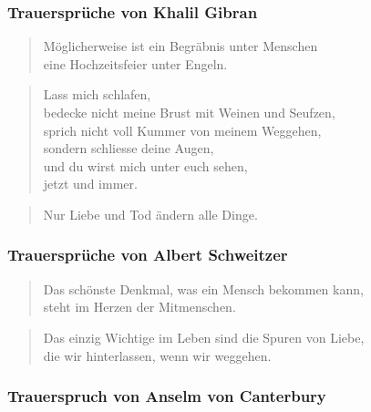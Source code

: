 \documentclass[ngerman,a4paper,11pt]{scrreprt}
\begin{document}
\subsubsection*{Trauersprüche von Khalil Gibran}
\label{sec-2-1-2-3-1}

\begin{verse}
Möglicherweise ist ein Begräbnis unter Menschen \\
eine Hochzeitsfeier unter Engeln. \\
\end{verse}

\begin{verse}
Lass mich schlafen, \\
bedecke nicht meine Brust mit Weinen und Seufzen, \\
sprich nicht voll Kummer von meinem Weggehen, \\
sondern schliesse deine Augen, \\
und du wirst mich unter euch sehen, \\
jetzt und immer. \\
\end{verse}

\begin{verse}
Nur Liebe und Tod ändern alle Dinge. \\
\end{verse}

\subsubsection*{Trauersprüche von Albert Schweitzer}
\label{sec-2-1-2-3-2}

\begin{verse}
Das schönste Denkmal, was ein Mensch bekommen kann, \\
steht im Herzen der Mitmenschen. \\
\end{verse}

\begin{verse}
Das einzig Wichtige im Leben sind die Spuren von Liebe, \\
die wir hinterlassen, wenn wir weggehen. \\
\end{verse}

\subsubsection*{Trauerspruch von Anselm von Canterbury}
\label{sec-2-1-2-3-3}
\end{document}
